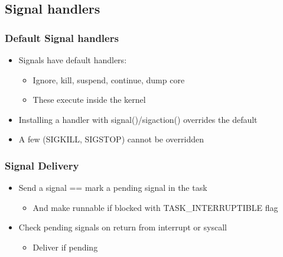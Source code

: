 \subsection{Signal handlers} %
\begin{frame}[fragile]
    \frametitle{Default Signal handlers}
    \begin{itemize}
        \item Signals have default handlers:
        \begin{itemize}
            \item Ignore, kill, suspend, continue, dump core
            \item These execute inside the kernel \pause
        \end{itemize}
        \item Installing a handler with signal()/sigaction() overrides the default
        \item A few (SIGKILL, SIGSTOP) cannot be overridden
    \end{itemize}
\end{frame}
% 
% 
% 
\begin{frame}[fragile]
    \frametitle{Signal Delivery}
    \begin{itemize}
        \item Send a signal == mark a pending signal in the task
        \begin{itemize}
            \item And make runnable if blocked with TASK\_INTERRUPTIBLE flag
        \end{itemize} \pause
        \item Check pending signals on return from interrupt or syscall
        \begin{itemize}
            \item Deliver if pending
        \end{itemize}
    \end{itemize}
\end{frame}
